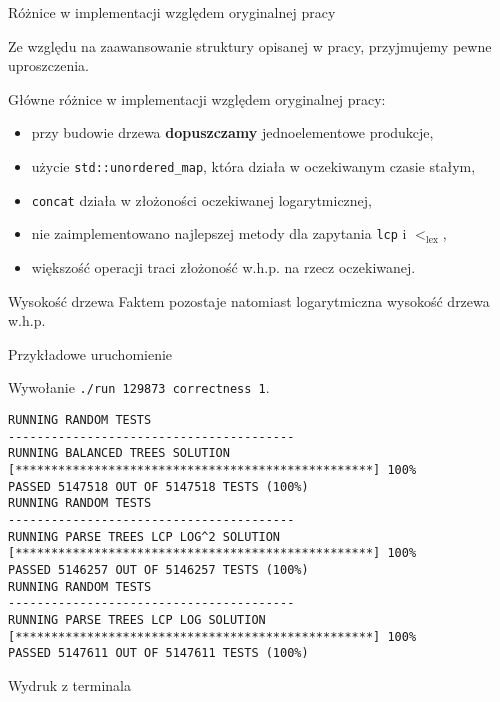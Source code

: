 \documentclass[polish]{beamer}
\begin{document}
\begin{frame}{Różnice w implementacji względem oryginalnej pracy}
    \begin{alertblock}{}
        Ze względu na zaawansowanie struktury opisanej w pracy, przyjmujemy pewne uproszczenia.
    \end{alertblock}
    \pause
    Główne różnice w implementacji względem oryginalnej pracy:
    \begin{itemize}
        \item przy budowie drzewa \textbf{dopuszczamy} jednoelementowe produkcje, \pause
        \item użycie \texttt{std::unordered\_map}, która działa w oczekiwanym czasie stałym, \pause
        \item \texttt{concat} działa w złożoności oczekiwanej logarytmicznej, \pause
        \item nie zaimplementowano najlepszej metody dla zapytania  \texttt{lcp} i $<_{\text{lex}}$, \pause
        \item większość operacji traci złożoność w.h.p. na rzecz oczekiwanej.
    \end{itemize}
    \pause
    \begin{block}{Wysokość drzewa}
        Faktem pozostaje natomiast logarytmiczna wysokość drzewa w.h.p.
    \end{block}
\end{frame}

\begin{frame}[fragile]{Przykładowe uruchomienie}
    \begin{example}
    Wywołanie \texttt{./run 129873 correctness 1}.
    \end{example}

\begin{lrbox}{\fourthbox}
    \begin{lstlisting}[basicstyle=\tiny,frame=single,linewidth=8cm]
RUNNING RANDOM TESTS
----------------------------------------
RUNNING BALANCED TREES SOLUTION
[**************************************************] 100%
PASSED 5147518 OUT OF 5147518 TESTS (100%)
RUNNING RANDOM TESTS
----------------------------------------
RUNNING PARSE TREES LCP LOG^2 SOLUTION
[**************************************************] 100%
PASSED 5146257 OUT OF 5146257 TESTS (100%)
RUNNING RANDOM TESTS
----------------------------------------
RUNNING PARSE TREES LCP LOG SOLUTION
[**************************************************] 100%
PASSED 5147611 OUT OF 5147611 TESTS (100%)
    \end{lstlisting}
\end{lrbox}
\begin{alertblock}{Wydruk z terminala}
\begin{center}
    \vskip 2mm
    \scalebox{1.2}{\usebox{\fourthbox}}
\end{center}
\end{alertblock}
\end{frame}
\end{document}
